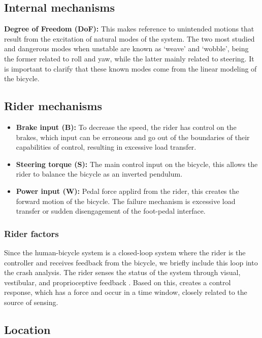 \documentclass{article}
\begin{document}
\subsection{Internal mechanisms}

\textbf{Degree of Freedom (DoF):} This makes reference to unintended motions that result from the excitation of natural modes of the system.
%
The two most studied and dangerous modes when unstable are known as `weave' and `wobble', being the former related to roll and yaw, while the latter mainly related to steering.
%
It is important to clarify that these known modes come from the linear modeling of the bicycle.

\subsection{Rider mechanisms}
\begin{itemize}
    \item \textbf{Brake input (B):} To decrease the speed, the rider has control on the brakes, which input can be erroneous and go out of the boundaries of their capabilities of control, resulting in excessive load transfer.
    \item \textbf{Steering torque (S):} The main control input on the bicycle, this allows the rider to balance the bicycle as an inverted pendulum.
    \item \textbf{Power input (W):} Pedal force applird from the rider, this creates the forward motion of the bicycle.
        The failure mechanism is excessive load transfer or sudden disengagement of the foot-pedal interface.
\end{itemize}


\subsubsection{Rider factors}

Since the human-bicycle system is a closed-loop system where the rider is the controller and receives feedback from the bicycle, we briefly include this loop into the crash analysis.
%
The rider senses the status of the system through visual, vestibular, and proprioceptive feedback \cite{Moo12}.
%
Based on this, creates a control response, which has a force and occur in a time window, closely related to the source of sensing.

\subsection{Location}
\end{document}
